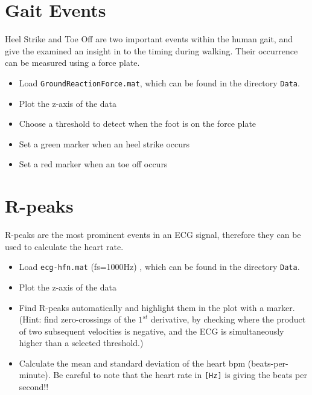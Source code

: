 \documentclass[12pt]{article}
\begin{document}
 \section{Gait Events}

Heel Strike and Toe Off are two important events within the human gait, and give
the examined an insight in to the timing during walking. Their occurrence can be
measured using a force plate.

\begin{itemize}
    \item Load \lstinline{GroundReactionForce.mat}, which can be found in the
        directory \lstinline{Data}.
    \item Plot the z-axis of the data
    \item Choose a threshold to detect when the foot is on the force plate
    \item Set a green marker when an heel strike occurs
    \item Set a red marker when an toe off occurs
\end{itemize}


\section{R-peaks}

R-peaks are the most prominent events in an ECG signal, therefore they can be
used to calculate the heart rate.

\begin{itemize}
    \item Load \lstinline{ecg-hfn.mat} (fs=1000Hz) , which can be found in the
        directory \lstinline{Data}.

    \item Plot the z-axis of the data

    \item Find R-peaks automatically and highlight them in the plot with a
        marker.\\ (Hint: find zero-crossings of the $1^{st}$ derivative, by
        checking where the product of two subsequent velocities is negative, and
        the ECG is simultaneously higher than a selected threshold.)

    \item Calculate the mean and standard deviation of the heart bpm
        (beats-per-minute). Be careful to note that the heart rate in
        \texttt{[Hz]} is giving the beats per second!!
\end{itemize}
\end{document}
